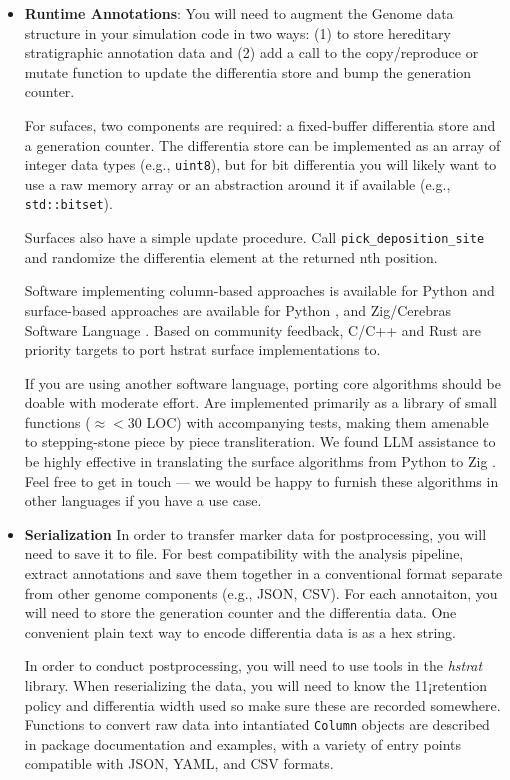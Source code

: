 \begin{itemize}
\item \textbf{Runtime Annotations}: 
You will need to augment the Genome data structure in your simulation code in two ways: (1) to store hereditary stratigraphic annotation data and (2) add a call to the copy/reproduce or mutate function to update the differentia store and bump the generation counter.

For sufaces, two components are required: a fixed-buffer differentia store and a generation counter.
The differentia store can be implemented as an array of integer data types (e.g., \texttt{uint8}), but for bit differentia you will likely want to use a raw memory array or an abstraction around it if available (e.g., \texttt{std::bitset}).

Surfaces also have a simple update procedure.
Call \texttt{pick\_deposition\_site} and randomize the differentia element at the returned nth position.

Software implementing column-based approaches is available for Python \citep{moreno2022hstrat} and surface-based approaches are available for Python \citep{TODO}, and Zig/Cerebras Software Language \citep{TODO}.
Based on community feedback, C/C++ and Rust are priority targets to port hstrat surface implementations to.

If you are using another software language, porting core algorithms should be doable with moderate effort.
Are implemented primarily as a library of small functions ($\approx<30$ LOC) with accompanying tests, making them amenable to stepping-stone piece by piece transliteration.
We found LLM assistance to be highly effective in translating the surface algorithms from Python to Zig \citep{TODO}.
Feel free to get in touch --- we would be happy to furnish these algorithms in other languages if you have a use case.
\item \textbf{Serialization}
In order to transfer marker data for postprocessing, you will need to save it to file.
For best compatibility with the analysis pipeline, extract annotations and save them together in a conventional format separate from other genome components (e.g., JSON, CSV).
For each annotaiton, you will need to store the generation counter and the differentia data.
One convenient plain text way to encode differentia data is as a hex string.

In order to conduct postprocessing, you will need to use tools in the \textit{hstrat} library.
When reserializing the data, you will need to know the 11¡retention policy and differentia width used so make sure these are recorded somewhere.
Functions to convert raw data into intantiated \texttt{Column} objects are described in package documentation and examples, with a variety of entry points compatible with JSON, YAML, and CSV formats. 


\end{itemize}
